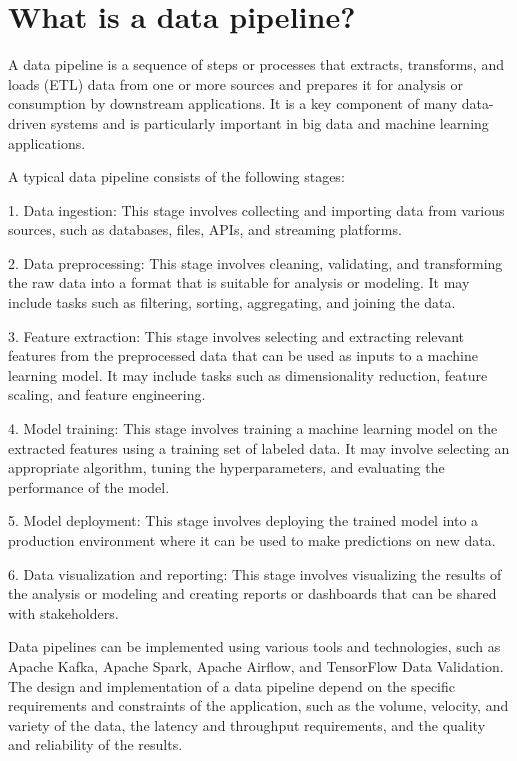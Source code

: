 \section{What is a data pipeline?}
A data pipeline is a sequence of steps or processes that extracts, transforms, and loads (ETL) data from one or more sources and prepares it for analysis or consumption by downstream applications. It is a key component of many data-driven systems and is particularly important in big data and machine learning applications.

A typical data pipeline consists of the following stages:

1. Data ingestion: This stage involves collecting and importing data from various sources, such as databases, files, APIs, and streaming platforms.

2. Data preprocessing: This stage involves cleaning, validating, and transforming the raw data into a format that is suitable for analysis or modeling. It may include tasks such as filtering, sorting, aggregating, and joining the data.

3. Feature extraction: This stage involves selecting and extracting relevant features from the preprocessed data that can be used as inputs to a machine learning model. It may include tasks such as dimensionality reduction, feature scaling, and feature engineering.

4. Model training: This stage involves training a machine learning model on the extracted features using a training set of labeled data. It may involve selecting an appropriate algorithm, tuning the hyperparameters, and evaluating the performance of the model.

5. Model deployment: This stage involves deploying the trained model into a production environment where it can be used to make predictions on new data.

6. Data visualization and reporting: This stage involves visualizing the results of the analysis or modeling and creating reports or dashboards that can be shared with stakeholders.

Data pipelines can be implemented using various tools and technologies, such as Apache Kafka, Apache Spark, Apache Airflow, and TensorFlow Data Validation. The design and implementation of a data pipeline depend on the specific requirements and constraints of the application, such as the volume, velocity, and variety of the data, the latency and throughput requirements, and the quality and reliability of the results.


